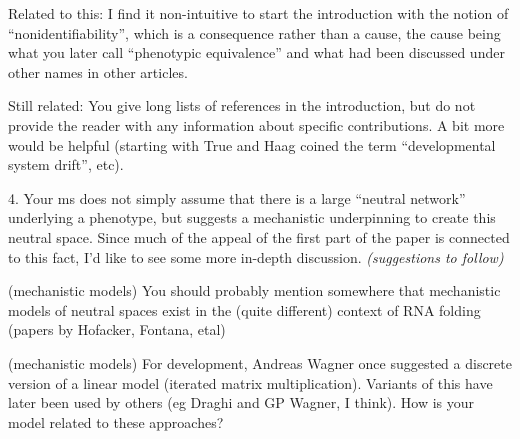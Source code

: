 
\begin{point}{}
    Related to this: I find it non-intuitive to start the introduction with the
notion of ``nonidentifiability'', which is a consequence rather than a cause, the
cause being what you later call ``phenotypic equivalence'' and what had been
discussed under other names in other articles.
\end{point}


\begin{point}{}
    Still related: You give long lists of references in the introduction, but do
not provide the reader with any information about specific contributions. A bit
more would be helpful (starting with True and Haag coined the term
``developmental system drift'', etc).
\end{point}


\begin{point}{4.}
    Your ms does not simply assume that there is a large ``neutral network''
underlying a phenotype, but suggests a mechanistic underpinning to create this
neutral space. Since much of the appeal of the first part of the paper is
connected to this fact, I'd like to see some more in-depth discussion.
\textit{(suggestions to follow)}
\end{point}


\begin{point}{(mechanistic models)}
    You should probably mention somewhere that mechanistic models of neutral
  spaces exist in the (quite different) context of RNA folding (papers by Hofacker, Fontana, etal)
\end{point}


\begin{point}{(mechanistic models)}
    For development, Andreas Wagner once suggested a discrete version of a linear
  model (iterated matrix multiplication). Variants of this have later been used
by others (eg Draghi and GP Wagner, I think). How is your model related to these approaches?
\end{point}

